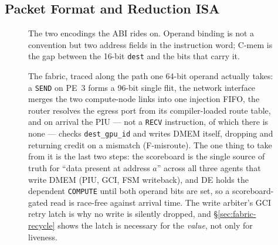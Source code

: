 \documentclass[journal,10pt]{IEEEtran}
\theoremstyle{plain}
\theoremstyle{definition}
\theoremstyle{remark}
\newcommand{\sv}[1]{\texttt{#1}}
\begin{document}
\subsection{Packet Format and Reduction ISA}\label{sec:fabric-isa}

\begin{figure}[!t]\centering

\caption{The two encodings the ABI rides on. Operand binding is not a convention but two address fields in the instruction word; \textsf{C-mem} is the gap between the 16-bit \sv{dest} and the \SendAddrBits{} bits that carry it.}\label{fig:isa}
\end{figure}


\begin{figure}[!t]
\centering

\caption{The fabric, traced along the path one 64-bit operand actually takes:
  a \texttt{SEND} on PE~3 forms a 96-bit single flit, the network interface
  merges the two compute-node links into one injection FIFO, the router
  resolves the egress port from its compiler-loaded route table, and on
  arrival the PIU --- not a \texttt{RECV} instruction, of which there is none
  --- checks \sv{dest\_gpu\_id} and writes DMEM itself, dropping and returning
  credit on a mismatch (\textsf{F-misroute}). The one thing to take from it is
  the last two steps: the scoreboard is the single source of truth for ``data
  present at address $a$'' across all three agents that write DMEM (PIU, GCI,
  FSM writeback), and \textsf{DE} holds the dependent \texttt{COMPUTE} until
  both operand bits are set, so a scoreboard-gated read is race-free against
  arrival time. The write arbiter's GCI retry latch is why no write is
  silently dropped, and \S\ref{sec:fabric-recycle} shows the latch is
  necessary for the \emph{value}, not only for liveness.}
\label{fig:pipeline}
\end{figure}
\end{document}

